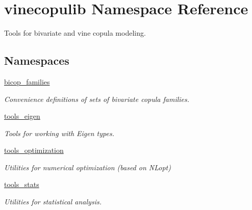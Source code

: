 \hypertarget{namespacevinecopulib}{}\section{vinecopulib Namespace Reference}
\label{namespacevinecopulib}


Tools for bivariate and vine copula modeling.  


\subsection*{Namespaces}
\begin{DoxyCompactItemize}
\item 
 \hyperlink{namespacevinecopulib_1_1bicop__families}{bicop\+\_\+families}
\begin{DoxyCompactList}\small\item\em Convenience definitions of sets of bivariate copula families. \end{DoxyCompactList}\item 
 \hyperlink{namespacevinecopulib_1_1tools__eigen}{tools\+\_\+eigen}
\begin{DoxyCompactList}\small\item\em Tools for working with Eigen types. \end{DoxyCompactList}\item 
 \hyperlink{namespacevinecopulib_1_1tools__optimization}{tools\+\_\+optimization}
\begin{DoxyCompactList}\small\item\em Utilities for numerical optimization (based on N\+Lopt) \end{DoxyCompactList}\item 
 \hyperlink{namespacevinecopulib_1_1tools__stats}{tools\+\_\+stats}
\begin{DoxyCompactList}\small\item\em Utilities for statistical analysis. \end{DoxyCompactList}\end{DoxyCompactItemize}
